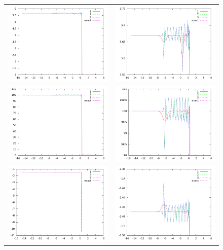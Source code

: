 \documentclass[letterpaper,12pt]{article}
\begin{document}
\begin{figure}[h]
  \begin{center}
	\begin{tabular}{cc}
      \includegraphics[width=.4\textwidth]{den_T11.png} &
	  \includegraphics[width=.4\textwidth]{den11zoom.png} \\
	  \includegraphics[width=.4\textwidth]{prs_T11.png} &	
	  \includegraphics[width=.4\textwidth]{prs11zoom.png} \\
      \includegraphics[width=.4\textwidth]{vel_T11.png} &	
      \includegraphics[width=.4\textwidth]{vel11zoom.png} \\
	\end{tabular}	
  \end{center}
  \caption{}
\end{figure}
\end{document}
